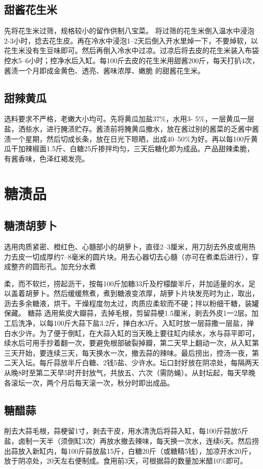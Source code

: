 \documentclass{ctexbook}
\begin{document}
\subsection{甜酱花生米}
先将花生米过筛，规格较小的留作供制八宝菜。
将过筛的花生米倒入温水中浸泡2-3小时，捻去花生皮。再在冷水中浸泡1--2天后倒入开水里焯一下，不要焯软，以花生米没有生豆味即可。然后再倒入冷水中过凉。过凉后将去皮的花生米装入布袋控水5--6小时；控净水后入缸。每100斤去皮的花生米用甜酱200斤，每天打扒4次，酱渍一个月即成金黄色、透亮、酱味浓厚、嫩脆
的甜酱花生米。
\subsection{甜辣黄瓜}
选料要求不严格，老嫩大小均可。先将黄瓜加盐37\%，水用3-
5\%，一层黄瓜一层盐，洒些水，进行腌渍贮存。酱渍前将腌黄瓜撤水，放在酱过别的酱菜的乏酱中酱渍一个星期，然后切成长条，放在日光下晾晒，出成40--50\%为好。再以每100斤黄瓜干加辣椒面1.5斤、白糖25斤掺拌均匀，三天后糖化即为成品。产品甜辣柔脆，有酱香味，色泽红褐发亮。
\section{糖渍品}
\subsection{糖渍胡萝卜}
选用肉质紧密、橙红色、心髓部小的胡萝卜，直径2--3厘米，用刀刮去外皮或用热力去皮一切成厚约7--8毫米的圆片块。用去心器切去心髓（亦可在煮柔后进行），穿成整齐的圆形孔。加充分水煮

柔，而不软烂，捞起沥干，按每100斤加糖33斤及柠檬酸半斤，并加适量的水，足以盖着胡萝卜。然后缓缓熬煮，煮到糖液变浓厚，胡萝卜片块发亮时为止，取出，沥去多余糖液，烘干。干燥程度勿太过，肉质应柔软而不硬；拌以粉细干糖，装罐保藏。
糖蒜
选用紫皮大瓣蒜，去掉毛根，剪留蒜梗1.5厘米，剥去外皮1一2层。加工后洗净，以每100斤大蒜下盐3.2斤，掸白水3斤。入缸时放一层蒜撒一层盐，掸白水少许。为了便于倒缸，在大蒜入缸的当天晚上要往缸内续水，水与蒜平即可，续水后可用手抄着翻一次，要避免根部破裂掉瓣，第二天早上翻动一次，从入缸第三天开始，要连续三天，每天换水一次，撤去蒜的辣味。最后捞出，控汤一夜，第二天入坛。每斤蒜放半斤白糖、2钱5盐、少许水。坛口封好放在阴凉处，每隔两天从晚8时至第二天早5时开封放气，共放五、六次（需防蝇）。从封坛起，每天早晚各滚坛一次，两个月后每天滚一次，秋分时即出成品。
\subsection{糖醋蒜}
削去大蒜毛根，蒜梗留1寸，剥去干皮，用水清洗后将蒜入缸，每100斤蒜放5斤盐，卤制一天半（须倒缸3次）再放水撤去辣味，每天换一次水，连续6天。然后捞出蒜放入新缸内，每100斤蒜放盐15斤，白糖20斤（或糖精5钱），加凉开水20斤，放于阴凉处，20天左右便制成。食用前3天，可根据蒜的数量加米醋10\%即可。
\end{document}
